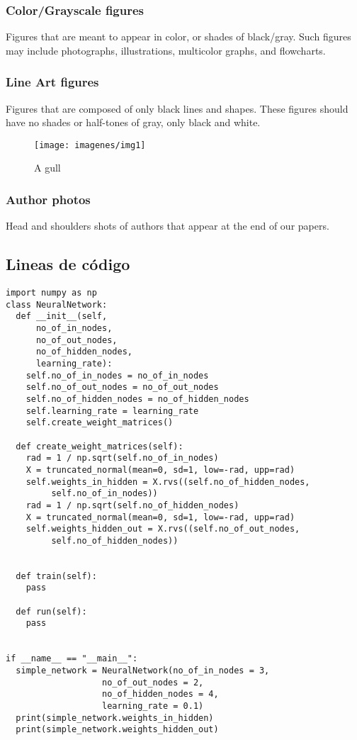 \documentclass[a4paper]{IEEEtran} %
\begin{document}
\subsubsection{Color/Grayscale figures}
{Figures that are meant to appear in color, or shades of black/gray. Such 
figures may include photographs, illustrations, multicolor graphs, and 
flowcharts.}



\subsubsection{Line Art figures}
{Figures that are composed of only black lines and shapes. These figures 
should have no shades or half-tones of gray, only black and white.}

\begin{figure}
    \centering
        \texttt{[image: imagenes/img1]}
        \caption{A gull}
        \label{fig:gull}
\end{figure}

\subsubsection{Author photos}
{Head and shoulders shots of authors that appear at the end of our papers. }

\subsection{Lineas de código}

\begin{lstlisting}[style=C]
import numpy as np
class NeuralNetwork:
  def __init__(self,
      no_of_in_nodes,
      no_of_out_nodes,
      no_of_hidden_nodes,
      learning_rate):
    self.no_of_in_nodes = no_of_in_nodes
    self.no_of_out_nodes = no_of_out_nodes
    self.no_of_hidden_nodes = no_of_hidden_nodes
    self.learning_rate = learning_rate
    self.create_weight_matrices()

  def create_weight_matrices(self):
    rad = 1 / np.sqrt(self.no_of_in_nodes)
    X = truncated_normal(mean=0, sd=1, low=-rad, upp=rad)
    self.weights_in_hidden = X.rvs((self.no_of_hidden_nodes,
         self.no_of_in_nodes))
    rad = 1 / np.sqrt(self.no_of_hidden_nodes)
    X = truncated_normal(mean=0, sd=1, low=-rad, upp=rad)
    self.weights_hidden_out = X.rvs((self.no_of_out_nodes,
         self.no_of_hidden_nodes))


  def train(self):
    pass

  def run(self):
    pass


if __name__ == "__main__":
  simple_network = NeuralNetwork(no_of_in_nodes = 3,
                   no_of_out_nodes = 2,
                   no_of_hidden_nodes = 4,
                   learning_rate = 0.1)
  print(simple_network.weights_in_hidden)
  print(simple_network.weights_hidden_out)
\end{lstlisting}
\end{document}
